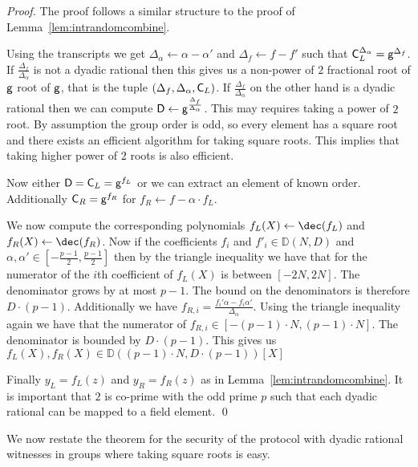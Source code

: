 \begin{proof}
The proof follows a similar structure to the proof of Lemma~\ref{lem:intrandomcombine}. 
		
	Using the transcripts we get $\Delta_\alpha\gets\alpha-\alpha'$ and $\Delta_f\gets f-f'$ such that $\mathsf{C}_{L}^{\Delta_\alpha}=\mathsf{g}^{\Delta_f}$. 
 If $\frac{\Delta_f}{\Delta_\alpha}$ is not a dyadic rational then this gives us a non-power of $2$ fractional root of $\mathsf{g}$ root of $\mathsf{g}$, that is the tuple $(\Delta_f,\Delta_\alpha,\mathsf{C}_{L})$.  
 If $\frac{\Delta_f}{\Delta_\alpha}$ on the other hand is a dyadic rational then we can compute $\mathsf{D}\gets\mathsf{g}^{\frac{\Delta_f}{\Delta_\alpha}}$. This may requires taking a power of $2$ root. By assumption the group order is odd, so every element has a square root and there exists an efficient algorithm for taking square roots. This implies that taking higher power of $2$ roots is also efficient.
  
  Now either $\mathsf{D} = \mathsf{C}_L=\mathsf{g}^{f_L}$ or we can extract an element of known order. Additionally $\mathsf{C}_R=\mathsf{g}^{f_R}$ for $f_R\gets f-\alpha \cdot f_L$.

 We now compute the corresponding polynomials $f_L(X)\gets \dec(f_L)$ and $f_R(X)\gets \dec(f_R)$.
Now if the coefficients $f_i$ and $f'_i\in \mathbb{D}(N,D)$ and $\alpha,\alpha' \in [-\frac{p-1}{2},\frac{p-1}{2}]$ then by the triangle inequality we have that for the numerator of the $i$th coefficient of $f_L(X)$ is between $[-2N,2N]$. The denominator grows by at most $p-1$. The bound on the denominators is therefore $D\cdot (p-1)$. Additionally we have $f_{R,i}=\frac{f_i'\alpha-f_i \alpha'}{\Delta_\alpha}$. Using the triangle inequality again we have that the numerator of $f_{R,i} \in [-(p-1) \cdot N, (p-1) \cdot N]$. The denominator is bounded by $D\cdot (p-1)$. This gives us $f_L(X),f_R(X)\in \mathbb{D}((p-1) \cdot N,D\cdot (p-1))[X]$

Finally $y_L=f_L(z)$ and $y_R=f_R(z)$ as in Lemma~\ref{lem:intrandomcombine}. It is important that $2$ is co-prime with the odd prime $p$ such that each dyadic rational can be mapped to a field element. \qed
\end{proof}


We now restate the theorem for the security of the protocol with dyadic rational witnesses in groups where taking square roots is easy.

\def\thetheorem{\ref{thm:dyadicpolysecurity}}
\begin{theorem}
\dyadicmaintheorem
\end{theorem}

